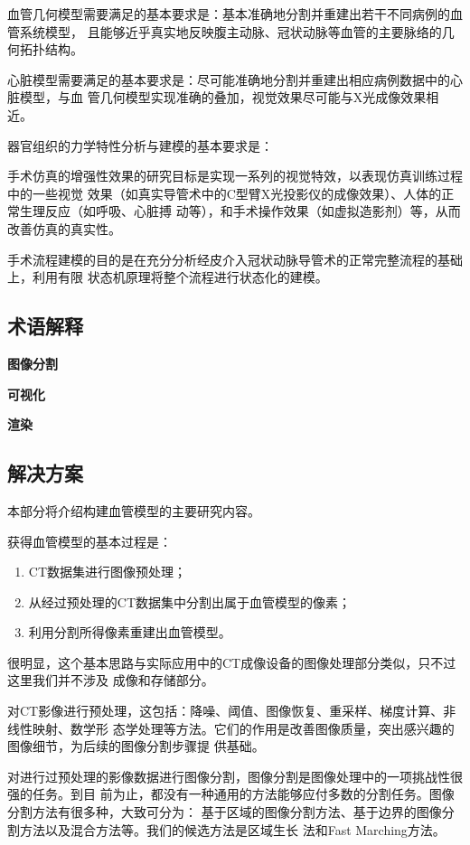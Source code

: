 血管几何模型需要满足的基本要求是：基本准确地分割并重建出若干不同病例的血管系统模型，
且能够近乎真实地反映腹主动脉、冠状动脉等血管的主要脉络的几何拓扑结构。

心脏模型需要满足的基本要求是：尽可能准确地分割并重建出相应病例数据中的心脏模型，与血
管几何模型实现准确的叠加，视觉效果尽可能与X光成像效果相近。

器官组织的力学特性分析与建模的基本要求是：

手术仿真的增强性效果的研究目标是实现一系列的视觉特效，以表现仿真训练过程中的一些视觉
效果（如真实导管术中的C型臂X光投影仪的成像效果）、人体的正常生理反应（如呼吸、心脏搏
动等），和手术操作效果（如虚拟造影剂）等，从而改善仿真的真实性。

手术流程建模的目的是在充分分析经皮介入冠状动脉导管术的正常完整流程的基础上，利用有限
状态机原理将整个流程进行状态化的建模。

\subsection{术语解释}
\label{subsec1-1-2}

\textbf{图像分割}

\textbf{可视化}

\textbf{渲染}

\subsection{解决方案}
\label{subsec1-1-3}

本部分将介绍构建血管模型的主要研究内容。

获得血管模型的基本过程是：
\begin{enumerate}
  \item CT数据集进行图像预处理；
  \item 从经过预处理的CT数据集中分割出属于血管模型的像素；
  \item 利用分割所得像素重建出血管模型。
\end{enumerate}
很明显，这个基本思路与实际应用中的CT成像设备的图像处理部分类似，只不过这里我们并不涉及
成像和存储部分。

对CT影像进行预处理，这包括：降噪、阈值、图像恢复、重采样、梯度计算、非线性映射、数学形
态学处理等方法。它们的作用是改善图像质量，突出感兴趣的图像细节，为后续的图像分割步骤提
供基础。

对进行过预处理的影像数据进行图像分割，图像分割是图像处理中的一项挑战性很强的任务。到目
前为止，都没有一种通用的方法能够应付多数的分割任务。图像分割方法有很多种，大致可分为：
基于区域的图像分割方法、基于边界的图像分割方法以及混合方法等。我们的候选方法是区域生长
法和Fast Marching方法。

